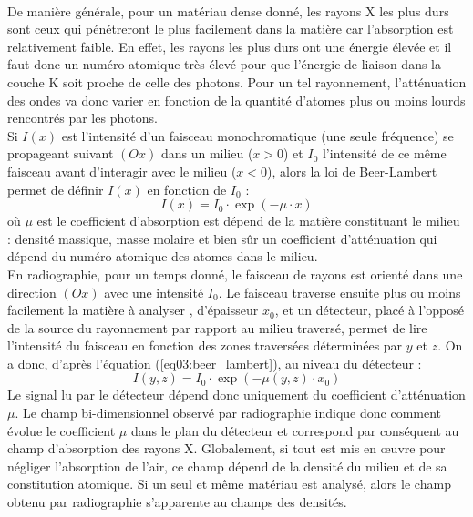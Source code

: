 			\\De manière générale, pour un matériau dense donné, les rayons X les plus durs sont ceux qui pénétreront le plus facilement dans la matière car l'absorption est relativement faible. En effet, les rayons les plus durs ont une énergie élevée et il faut donc un numéro atomique très élevé pour que l'énergie de liaison dans la couche K soit proche de celle des photons. Pour un tel rayonnement, l'atténuation des ondes va donc varier en fonction de la quantité d'atomes plus ou moins lourds rencontrés par les photons.
			\\Si $I(x)$ est l'intensité d'un faisceau monochromatique (une seule fréquence) se propageant suivant $(Ox)$ dans un milieu ($x>0$) et $I_0$ l'intensité de ce même faisceau avant d'interagir avec le milieu ($x<0$), alors la loi de Beer-Lambert permet de définir $I(x)$ en fonction de $I_0$ :
			\begin{equation}\label{eq03:beer_lambert}
				I(x) = I_0\cdot\exp{(-\mu\cdot x)}
			\end{equation}
			où $\mu$ est le coefficient d'absorption est dépend de la matière constituant le milieu : densité massique, masse molaire et bien sûr un coefficient d'atténuation qui dépend du numéro atomique des atomes dans le milieu.
			\\En radiographie, pour un temps donné, le faisceau de rayons est orienté dans une direction $(Ox)$ avec une intensité $I_0$. Le faisceau traverse ensuite plus ou moins facilement la matière à analyser , d'épaisseur $x_0$, et un détecteur, placé à l'opposé de la source du rayonnement par rapport au milieu traversé, permet de lire l'intensité du faisceau en fonction des zones traversées déterminées par $y$ et $z$. On a donc, d'après l'équation (\ref{eq03:beer_lambert}), au niveau du détecteur :
			\begin{equation}\label{eq03:beer_lambert_radio}
				I(y,z) = I_0\cdot\exp{(-\mu(y,z)\cdot x_0)}
			\end{equation}
			Le signal lu par le détecteur dépend donc uniquement du coefficient d'atténuation $\mu$. Le champ bi-dimensionnel observé par radiographie indique donc comment évolue le coefficient $\mu$ dans le plan du détecteur et correspond par conséquent au champ d'absorption des rayons X. Globalement, si tout est mis en \oe{}uvre pour négliger l'absorption de l'air, ce champ dépend de la densité du milieu et de sa constitution atomique. Si un seul et même matériau est analysé, alors le champ obtenu par radiographie s'apparente au champs des densités.
